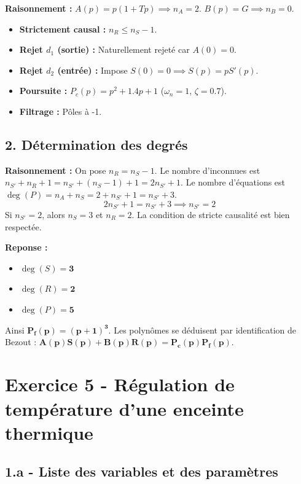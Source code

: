 \documentclass[11pt,a4paper]{article}
\begin{document}
\textbf{Raisonnement :}
$A(p) = p(1+Tp) \implies n_A = 2$.
$B(p) = G \implies n_B = 0$.
\begin{itemize}
    \item \textbf{Strictement causal :} $n_R \le n_S - 1$.
    \item \textbf{Rejet $d_1$ (sortie) :} Naturellement rejeté car $A(0)=0$.
    \item \textbf{Rejet $d_2$ (entrée) :} Impose $S(0)=0 \implies S(p) = p S'(p)$.
    \item \textbf{Poursuite :} $P_c(p) = p^2 + 1.4p + 1$ ($\omega_n=1$, $\zeta=0.7$).
    \item \textbf{Filtrage :} Pôles à -1.
\end{itemize}

\subsection*{2. Détermination des degrés}

\textbf{Raisonnement :} On pose $n_R = n_S - 1$. Le nombre d'inconnues est $n_{S'} + n_R + 1 = n_{S'} + (n_S - 1) + 1 = 2n_{S'} + 1$.
Le nombre d'équations est $\deg(P) = n_A + n_S = 2 + n_{S'} + 1 = n_{S'} + 3$.
$$ 2n_{S'} + 1 = n_{S'} + 3 \implies n_{S'} = 2 $$
Si $n_{S'} = 2$, alors $n_S = 3$ et $n_R = 2$. La condition de stricte causalité est bien respectée.

\textbf{Reponse :}
\begin{itemize}
    \item $\deg(S) = \mathbf{3}$
    \item $\deg(R) = \mathbf{2}$
    \item $\deg(P) = \mathbf{5}$
\end{itemize}
Ainsi $\mathbf{P_f(p) = (p+1)^3}$. Les polynômes se déduisent par identification de Bezout : $\mathbf{A(p)S(p) + B(p)R(p) = P_c(p)P_f(p)}$.

\hrulefill

\section*{Exercice 5 - Régulation de température d'une enceinte thermique}

\subsection*{1.a - Liste des variables et des paramètres}
\end{document}
